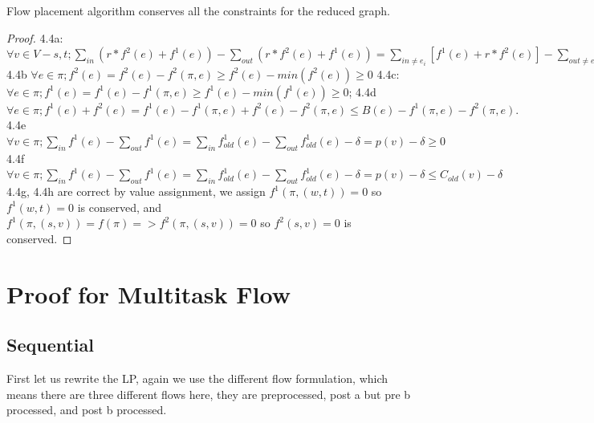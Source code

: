 \documentclass[twoside,leqno, 11pt]{article}
\begin{document}
\begin{theorem}Flow placement algorithm conserves all the constraints for the reduced graph.
\end{theorem}
\begin{proof}
4.4a:\newline
$\forall v \in V-{s, t}; \sum\limits_{in} ( r* f^2(e) +f^1(e)) - \sum\limits_{out } (r*f^2(e) + f^1(e)) =\sum\limits_{in\not=e_i}[f^1(e) +r*f^2(e)] - \sum\limits_{out\not=e_{i+1} } [f^1(e)+r*f^2(e)] +[f^1(e_i)+f^2(e_i)*r-f^1(\pi, e_i) - r*f^2(\pi, e_i) ] - [f^1(e_{i+1})+f^2(e_{i+1})*r -f^1(\pi, e_i) - r*f^2(\pi, e_i) ] = f(\pi)*r - f(\pi)*r =0  $
\newline
4.4b\newline
$\forall e \in \pi; f^2(e) = f^2(e) -f^2(\pi, e) \geq f^2(e) -min(f^2(e)) \geq 0$  
\newline
4.4c:\newline
$\forall e \in \pi; f^1(e) = f^1(e) -f^1(\pi, e) \geq f^1(e) -min( f^1(e) )\geq 0$;\newline
4.4d\newline
$\forall e \in \pi; f^1(e) +f^2(e) = f^1(e)-f^1(\pi, e) +f^2(e)- f^2(\pi, e) \leq B(e)- f^1(\pi, e) - f^2(\pi, e) .$
\newline
4.4e\newline
$\forall v \in \pi; \sum\limits_{in } f^1(e) - \sum\limits_{out} f^1(e) = \sum\limits_{in } f^1_{old}(e) - \sum\limits_{out} f^1_{old}(e) -\delta= p(v) -\delta \geq 0$\newline
4.4f\newline
$\forall v \in \pi; \sum\limits_{in } f^1(e) - \sum\limits_{out} f^1(e) = \sum\limits_{in } f^1_{old}(e) - \sum\limits_{out} f^1_{old}(e) -\delta= p(v) -\delta \leq C_{old}(v) -\delta$\newline
4.4g, 4.4h are correct by value assignment, we assign $f^1(\pi,(w, t) )=0$ so $f^1(w, t) =0$ is conserved, and $f^1(\pi, (s, v)) =f(\pi) => f^2(\pi, (s,v)) =0$ so $f^2(s, v)=0$ is conserved. 
\newline
\end{proof}

\section{Proof for Multitask Flow}
\subsection{Sequential}
First let us rewrite the LP, again we use the different flow formulation, which means there are three different flows here, they are preprocessed, post a but pre b processed, and post b processed.
\end{document}
